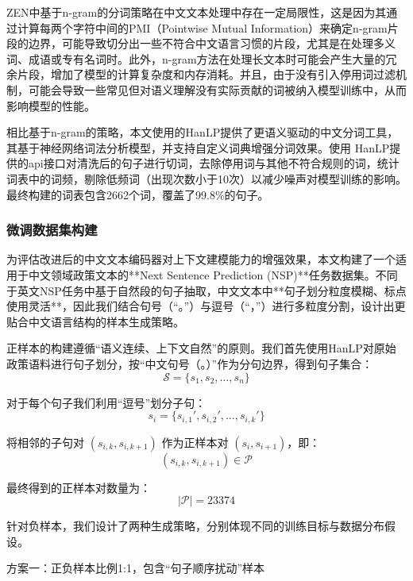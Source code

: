 \documentclass[12pt, a4paper]{ctexart}
\begin{document}
ZEN中基于n-gram的分词策略在中文文本处理中存在一定局限性，这是因为其通过计算每两个字符中间的PMI（Pointwise Mutual Information）来确定n-gram片段的边界，可能导致切分出一些不符合中文语言习惯的片段，尤其是在处理多义词、成语或专有名词时。此外，n-gram方法在处理长文本时可能会产生大量的冗余片段，增加了模型的计算复杂度和内存消耗。并且，由于没有引入停用词过滤机制，可能会导致一些常见但对语义理解没有实际贡献的词被纳入模型训练中，从而影响模型的性能。

相比基于n-gram的策略，本文使用的HanLP提供了更语义驱动的中文分词工具，其基于神经网络词法分析模型，并支持自定义词典增强分词效果。使用 HanLP提供的api接口对清洗后的句子进行切词，去除停用词与其他不符合规则的词，统计词表中的词频，剔除低频词（出现次数小于10次）以减少噪声对模型训练的影响。最终构建的词表包含2662个词，覆盖了99.8\%的句子。

\subsubsection{微调数据集构建}
为评估改进后的中文文本编码器对上下文建模能力的增强效果，本文构建了一个适用于中文领域政策文本的**Next Sentence Prediction (NSP)**任务数据集。不同于英文NSP任务中基于自然段的句子抽取，中文文本中**句子划分粒度模糊、标点使用灵活**，因此我们结合句号（“。”）与逗号（“，”）进行多粒度分割，设计出更贴合中文语言结构的样本生成策略。

正样本的构建遵循“语义连续、上下文自然”的原则。我们首先使用HanLP对原始政策语料进行句子划分，按“中文句号（。）”作为分句边界，得到句子集合：
\begin{equation}
\mathcal{S} = \{s_1, s_2, \ldots, s_n\}
\end{equation}

对于每个句子我们利用“逗号”划分子句：
\begin{equation}
s_i = \{s_{i,1}', s_{i,2}', \ldots, s_{i,k}'\}
\end{equation}

将相邻的子句对 $(s_{i,k}, s_{i,k+1})$ 作为正样本对 $(s_i, s_{i+1})$，即：
\begin{equation}
(s_{i,k}, s_{i,k+1}) \in \mathcal{P}
\end{equation}

最终得到的正样本对数量为：
\begin{equation}
|\mathcal{P}| = 23374
\end{equation}

针对负样本，我们设计了两种生成策略，分别体现不同的训练目标与数据分布假设。

方案一：正负样本比例1:1，包含“句子顺序扰动”样本
\end{document}
